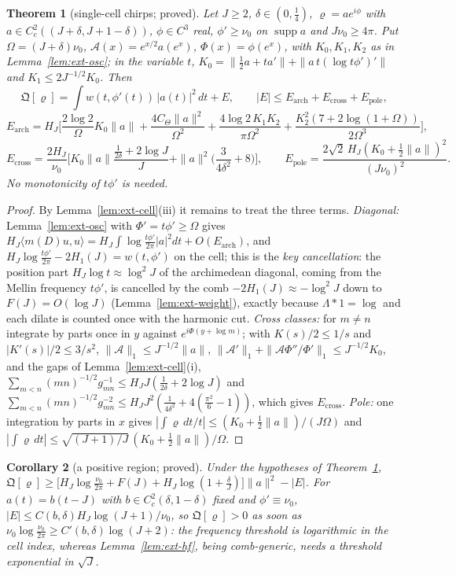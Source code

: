 \documentclass[11pt]{amsart}
\newtheorem{theorem}{Theorem}[section]
\newtheorem{corollary}[theorem]{Corollary}
\theoremstyle{definition}
\theoremstyle{remark}
\newcommand{\supp}{\operatorname{supp}}
\begin{document}
\begin{theorem}[single-cell chirps; proved]\label{thm:ext-cell}
Let $J\ge2$, $\delta\in(0,\frac14)$, $\varrho=ae^{i\phi}$ with $a\in C_c^2((J+\delta,J+1-\delta))$, $\phi\in C^3$ real, $\phi'\ge\nu_0$ on
$\supp a$ and $J\nu_0\ge4\pi$. Put $\Omega=(J+\delta)\nu_0$, $\mathcal A(x)=e^{x/2}a(e^x)$, $\Phi(x)=\phi(e^x)$, with $K_0,K_1,K_2$ as in
Lemma~\ref{lem:ext-osc}; in the variable $t$, $K_0=\|\frac12a+ta'\|+\|a\,t(\log t\phi')'\|$ and $K_1\le2J^{-1/2}K_0$. Then
\[
\mathfrak Q[\varrho]=\int w(t,\phi'(t))\,|a(t)|^2\,dt+E,\qquad |E|\le E_{\mathrm{arch}}+E_{\mathrm{cross}}+E_{\mathrm{pole}},
\]
\[
E_{\mathrm{arch}}=H_J\Big[\frac{2\log2}\Omega K_0\|a\|+\frac{4C_\Theta\|a\|^2}{\Omega^2}+\frac{4\log2\,K_1K_2}{\pi\Omega^2}+\frac{K_2^2(7+2\log(1+\Omega))}{2\Omega^3}\Big],
\]
\[
E_{\mathrm{cross}}=\frac{2H_J}{\nu_0}\Big[K_0\|a\|\frac{\frac1{2\delta}+2\log J}J+\|a\|^2\Big(\frac3{4\delta^2}+8\Big)\Big],\qquad
E_{\mathrm{pole}}=\frac{2\sqrt2\,H_J(K_0+\frac12\|a\|)^2}{(J\nu_0)^2}.
\]
No monotonicity of $t\phi'$ is needed.
\end{theorem}
\begin{proof}
By Lemma~\ref{lem:ext-cell}(iii) it remains to treat the three terms. \emph{Diagonal:} Lemma~\ref{lem:ext-osc} with $\Phi'=t\phi'\ge\Omega$
gives $H_J\langle m(D)u,u\rangle=H_J\int\log\frac{t\phi'}{2\pi}|a|^2dt+O(E_{\mathrm{arch}})$, and $H_J\log\frac{t\phi'}{2\pi}-2H_1(J)=w(t,\phi')$
on the cell; this is the \emph{key cancellation}: the position part $H_J\log t\approx\log^2J$ of the archimedean diagonal, coming
from the Mellin frequency $t\phi'$, is cancelled by the comb $-2H_1(J)\approx-\log^2J$ down to $F(J)=O(\log J)$ (Lemma~\ref{lem:ext-weight}),
exactly because $\Lambda*1=\log$ and each dilate is counted once with the harmonic cut. \emph{Cross classes:} for $m\ne n$
integrate by parts once in $y$ against $e^{i\Phi(y+\log m)}$; with $K(s)/2\le1/s$ and $|K'(s)|/2\le3/s^2$, $\|\mathcal A\|_1\le J^{-1/2}\|a\|$,
$\|\mathcal A'\|_1+\|\mathcal A\Phi''/\Phi'\|_1\le J^{-1/2}K_0$, and the gaps of Lemma~\ref{lem:ext-cell}(i),
$\sum_{m<n}(mn)^{-1/2}g_{mn}^{-1}\le H_JJ(\frac1{2\delta}+2\log J)$ and
$\sum_{m<n}(mn)^{-1/2}g_{mn}^{-2}\le H_JJ^2(\frac1{4\delta^2}+4(\frac{\pi^2}6-1))$, which gives $E_{\mathrm{cross}}$. \emph{Pole:} one
integration by parts in $x$ gives $|\int\varrho\,dt/t|\le(K_0+\frac12\|a\|)/(J\Omega)$ and
$|\int\varrho\,dt|\le\sqrt{(J+1)/J}\,(K_0+\frac12\|a\|)/\Omega$.
\end{proof}

\begin{corollary}[a positive region; proved]\label{cor:ext-cellpos}
Under the hypotheses of Theorem~\ref{thm:ext-cell},
$\mathfrak Q[\varrho]\ge\big[H_J\log\frac{\nu_0}{2\pi}+F(J)+H_J\log(1+\frac\delta J)\big]\|a\|^2-|E|$. For $a(t)=b(t-J)$ with $b\in
C_c^2(\delta,1-\delta)$ fixed and $\phi'\equiv\nu_0$, $|E|\le C(b,\delta)H_J\log(J+1)/\nu_0$, so $\mathfrak Q[\varrho]>0$ as soon as
$\nu_0\log\frac{\nu_0}{2\pi}\ge C'(b,\delta)\log(J+2)$: the frequency threshold is logarithmic in the cell index, whereas
Lemma~\ref{lem:ext-hf}, being comb-generic, needs a threshold exponential in $\sqrt J$.
\end{corollary}
\end{document}
